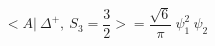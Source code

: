 \begin{equation}
<A|~\Delta^{+},~ S_3=\frac{3}{2} >= \frac{\sqrt{6}}{\pi} ~\psi_1^2~\psi_2
\end{equation}

